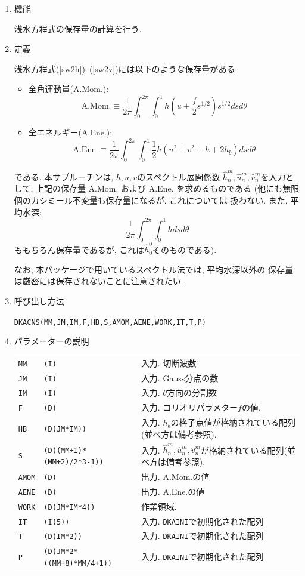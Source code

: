 \documentclass[a4j,fleqn]{jarticle}
\begin{document}
\begin{enumerate}

\item 機能

浅水方程式の保存量の計算を行う.

\item 定義

浅水方程式(\ref{sw2h})--(\ref{sw2v})には以下のような保存量がある:
\begin{itemize}
\item 全角運動量(A.Mom.):
\begin{equation}
\mbox{A.Mom.}\equiv
\frac1{2\pi}\int^{2\pi}_0\!\!\int^1_0
h(u+\frac{f}{2}s^{1/2})s^{1/2}dsd\theta
\end{equation}
\item 全エネルギー(A.Ene.):
\begin{equation}
\mbox{A.Ene.}\equiv
\frac1{2\pi}\int^{2\pi}_0\!\!\int^1_0
\frac12 h(u^2+v^2+h+2h_b)
ds d\theta
\end{equation}
\end{itemize}
である.
本サブルーチンは, $h,u,v$のスペクトル展開係数
$\hat h^m_n,\hat u^m_n,\hat v^m_n$を入力として, 
上記の保存量 A.Mom. および A.Ene. を求めるものである
(他にも無限個のカシミール不変量も保存量になるが, これについては
扱わない. また, 平均水深:
\[
\frac1{2\pi}\int^{2\pi}_0\!\!\int^1_0
hdsd\theta
\]
ももちろん保存量であるが, これは$\hat h^0_0$そのものである).

なお, 本パッケージで用いているスペクトル法では, 平均水深以外の
保存量は厳密には保存されないことに注意されたい.

\item 呼び出し方法 
    
{\tt DKACNS(MM,JM,IM,F,HB,S,AMOM,AENE,WORK,IT,T,P)}
  
\item パラメーターの説明 
    
\begin{tabular}{lll}
{\tt MM} & {\tt (I)} & 入力. 切断波数\\
{\tt JM} & {\tt (I)} & 入力. Gauss分点の数\\
{\tt IM} & {\tt (I)} & 入力. $\theta$方向の分割数\\
{\tt F}   & {\tt (D)} & 入力. コリオリパラメター$f$の値.\\
{\tt HB}   & {\tt (D(JM*IM))} & 入力. $h_b$の格子点値が格納されている配列(並べ方は備考参照).\\
{\tt S}   & {\tt (D((MM+1)*(MM+2)/2*3-1))} & 入力. $\hat h^m_n,\hat u^m_n,\hat
v^m_n$が格納されている配列(並べ方は備考参照).\\
{\tt AMOM} & {\tt (D)} 
& 出力. A.Mom.の値\\
{\tt AENE} & {\tt (D)}
& 出力. A.Ene.の値\\
{\tt WORK}   & {\tt (D(JM*IM*4))} & 作業領域.\\
{\tt IT}  & {\tt (I(5))}    & 入力. {\tt DKAINI}で初期化された配列\\
{\tt T}   & {\tt (D(IM*2))} & 入力. {\tt DKAINI}で初期化された配列\\
{\tt P}  & {\tt (D(JM*2*((MM+8)*MM/4+1))} & 入力. {\tt DKAINI}で初期化された配列\\
\end{tabular}


\end{enumerate}
\end{document}
